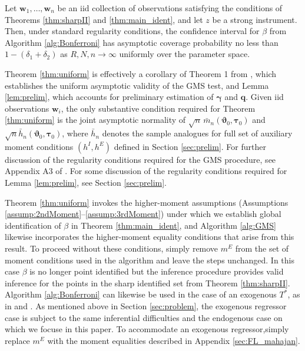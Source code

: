 \begin{thm}
  Let $\mathbf{w}_1, \hdots, \mathbf{w}_n$ be an iid collection of observations satisfying the conditions of Theorems \ref{thm:sharpII} and \ref{thm:main_ident}, and let $z$ be a strong instrument.
  Then, under standard regularity conditions, the confidence interval for $\beta$ from Algorithm \ref{alg:Bonferroni} has asymptotic coverage probability no less than $1 - (\delta_1 + \delta_2)$ as $R,N,n\rightarrow \infty$ uniformly over the parameter space.
  \label{thm:uniform}
\end{thm}

Theorem \ref{thm:uniform} is effectively a corollary of Theorem 1 from \cite{AndrewsSoares}, which establishes the uniform asymptotic validity of the GMS test, and Lemma \ref{lem:prelim}, which accounts for preliminary estimation of $\boldsymbol{\gamma}$ and $\mathbf{q}$.
Given iid observations $\mathbf{w}_i$, the only substantive condition required for Theorem \ref{thm:uniform} is the joint asymptotic normality of $\sqrt{n} \,\bar{m}_n(\boldsymbol{\vartheta}_0, \boldsymbol{\tau}_0)$ and $\sqrt{n}\bar{h}_n(\boldsymbol{\vartheta}_0, \boldsymbol{\tau}_0)$, where $\bar{h}_n$ denotes the sample analogues for full set of auxiliary moment conditions $(h^I, h^E)$ defined in Section \ref{sec:prelim}.
For further discussion of the regularity conditions required for the GMS procedure, see Appendix A3 of \cite{AndrewsSoares}.
For some discussion of the regularity conditions required for Lemma \ref{lem:prelim}, see Section \ref{sec:prelim}.

Theorem \ref{thm:uniform} invokes the higher-moment assumptions (Assumptions \ref{assump:2ndMoment}--\ref{assump:3rdMoment}) under which we establish global identification of $\beta$ in Theorem \ref{thm:main_ident}, and Algorithm \ref{alg:GMS} likewise incorporates the higher-moment equality conditions that arise from this result.
To proceed without these conditions, simply remove $m^E$ from the set of moment conditions used in the algorithm and leave the steps unchanged.
In this case $\beta$ is no longer point identified but the inference procedure provides valid inference for the points in the sharp identified set from Theorem \ref{thm:sharpII}.
Algorithm \ref{alg:Bonferroni} can likewise be used in the case of an exogenous $T^*$, as in \cite{Mahajan} and \cite{FL}.
As mentioned above in Section \ref{sec:problem}, the exogenous regressor case is subject to the same inferential difficulties and the endogenous case on which we focuse in this paper.
To accommodate an exogenous regressor,simply replace $m^E$ with the moment equalities described in Appendix \ref{sec:FL_mahajan}.


